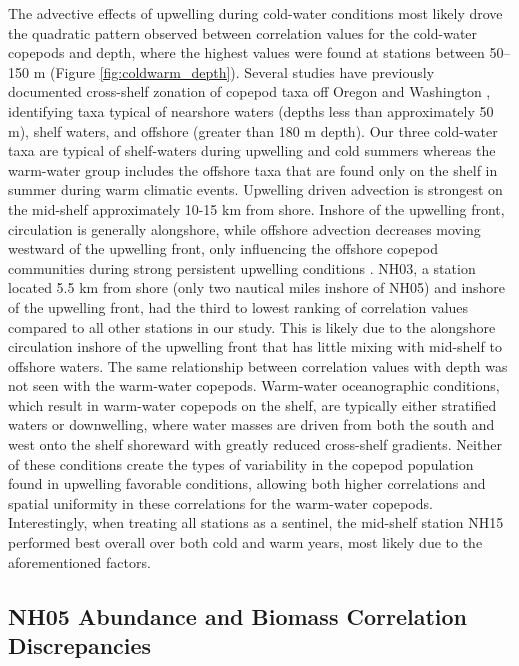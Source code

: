 \documentclass[preprint, authoryear, 12pt]{elsarticle}
\begin{document}
The advective effects of upwelling during cold-water conditions most likely drove the quadratic pattern observed between correlation values for the cold-water copepods and depth, where the highest values were found at stations between 50–150 m (Figure \ref{fig:coldwarm_depth}). Several studies have previously documented cross-shelf zonation of copepod taxa off Oregon \citep{peterson1979zonation, keister2003zonal, morgan2003onshore} and Washington \citep{landry1989broad}, identifying taxa typical of nearshore waters (depths less than approximately 50 m), shelf waters, and offshore (greater than 180 m depth).   Our three cold-water taxa are typical of shelf-waters during upwelling and cold summers whereas the warm-water group includes the offshore taxa that are found only on the shelf in summer during warm climatic events.  Upwelling driven advection is strongest on the mid-shelf approximately 10-15 km from shore. Inshore of the upwelling front, circulation is generally alongshore, while offshore advection decreases moving westward of the upwelling front, only influencing the offshore copepod communities during strong persistent upwelling conditions \citep{peterson1979zonation}.   NH03, a station located 5.5 km from shore (only two nautical miles inshore of NH05) and inshore of the upwelling front, had the third to lowest ranking of correlation values compared to all other stations in our study. This is likely due to the alongshore circulation inshore of the upwelling front that has little mixing with mid-shelf to offshore waters.  The same relationship between correlation values with depth was not seen with the warm-water copepods. Warm-water oceanographic conditions, which result in warm-water copepods on the shelf, are typically either stratified waters or downwelling, where water masses are driven from both the south and west onto the shelf shoreward with greatly reduced cross-shelf gradients.  Neither of these conditions create the types of variability in the copepod population found in upwelling favorable conditions, allowing both higher correlations and spatial uniformity in these correlations for the warm-water copepods.  Interestingly, when treating all stations as a sentinel, the mid-shelf station NH15 performed best overall over both cold and warm years, most likely due to the aforementioned factors.  

\subsection{NH05 Abundance and Biomass Correlation Discrepancies}
\end{document}
